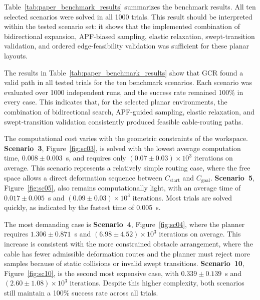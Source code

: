 \documentclass{pas}
\begin{document}
Table~\ref{tab:paper_benchmark_results} summarizes the benchmark results.
All ten selected scenarios were solved in all 1000 trials.
This result should be interpreted within the tested scenario set: it shows that the implemented combination of bidirectional expansion, APF-biased sampling, elastic relaxation, swept-transition validation, and ordered edge-feasibility validation was sufficient for these planar layouts.

\begin{table}[t]
    \centering
    \caption{Benchmark performance for the selected GCR scenarios.}
    \label{tab:paper_benchmark_results}
    \setlength{\tabcolsep}{2.5pt}
    
\end{table}

The results in Table~\ref{tab:paper_benchmark_results} show that GCR found a valid path in all tested trials for the ten benchmark scenarios.
Each scenario was evaluated over 1000 independent runs, and the success rate remained 100\% in every case.
This indicates that, for the selected planar environments, the combination of bidirectional search, APF-guided sampling, elastic relaxation, and swept-transition validation consistently produced feasible cable-routing paths.

The computational cost varies with the geometric constraints of the workspace.
\textbf{Scenario~3}, Figure~\ref{fig:sc03}, is solved with the lowest average computation time, $0.008 \pm 0.003$~s, and requires only $(0.07 \pm 0.03)\times 10^3$ iterations on average.
This scenario represents a relatively simple routing case, where the free space allows a direct deformation sequence between $C_{\mathrm{start}}$ and $C_{\mathrm{goal}}$.
\textbf{Scenario~5}, Figure~\ref{fig:sc05}, also remains computationally light, with an average time of $0.017 \pm 0.005$~s and $(0.09 \pm 0.03)\times 10^3$ iterations.
Most trials are solved quickly, as indicated by the fastest time of 0.005~s.

The most demanding case is \textbf{Scenario~4}, Figure~\ref{fig:sc04}, where the planner requires $1.306 \pm 0.871$~s and $(6.98 \pm 4.52)\times 10^3$ iterations on average.
This increase is consistent with the more constrained obstacle arrangement, where the cable has fewer admissible deformation routes and the planner must reject more samples because of static collisions or invalid swept transitions.
\textbf{Scenario~10}, Figure~\ref{fig:sc10}, is the second most expensive case, with $0.339 \pm 0.139$~s and $(2.60 \pm 1.08)\times 10^3$ iterations.
Despite this higher complexity, both scenarios still maintain a 100\% success rate across all trials.
\end{document}
